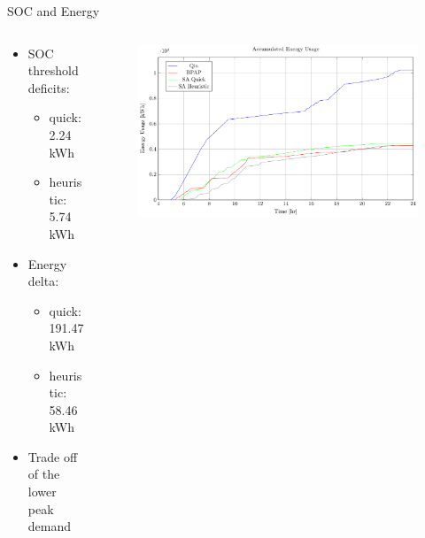 \documentclass[aspectratio=169,dvipsnames]{beamer}
\begin{document}
\begin{frame}[label={sec:org762bfe2}]{SOC and Energy}
\begin{columns}
\begin{column}{0.3\columnwidth}
\begin{itemize}
\item SOC threshold deficits:
\begin{itemize}
\item quick: 2.24 kWh
\item heuristic: 5.74 kWh
\end{itemize}
\item Energy delta:
\begin{itemize}
\item quick: 191.47 kWh
\item heuristic: 58.46 kWh
\end{itemize}
\item Trade off of the lower peak demand
\end{itemize}
\end{column}

\begin{column}{0.7\columnwidth}
\begin{figure}[htpb]
\centering
    \includegraphics[width=\textwidth]{img/sa-pap-paper-good/energy}
\end{figure}
\end{column}
\end{columns}
\end{frame}
\end{document}
